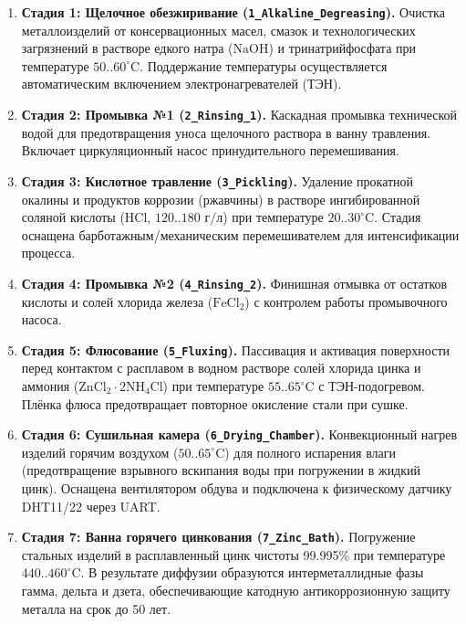 \documentclass[14pt, a4paper]{extarticle}
\begin{document}
\begin{enumerate}
    \item \textbf{Стадия 1: Щелочное обезжиривание (\texttt{1\_Alkaline\_Degreasing}).} Очистка металлоизделий от консервационных масел, смазок и технологических загрязнений в растворе едкого натра ($\mathrm{NaOH}$) и тринатрийфосфата при температуре $50..60^\circ\text{C}$. Поддержание температуры осуществляется автоматическим включением электронагревателей (ТЭН).
    \item \textbf{Стадия 2: Промывка №1 (\texttt{2\_Rinsing\_1}).} Каскадная промывка технической водой для предотвращения уноса щелочного раствора в ванну травления. Включает циркуляционный насос принудительного перемешивания.
    \item \textbf{Стадия 3: Кислотное травление (\texttt{3\_Pickling}).} Удаление прокатной окалины и продуктов коррозии (ржавчины) в растворе ингибированной соляной кислоты ($\mathrm{HCl}$, $120..180\text{ г/л}$) при температуре $20..30^\circ\text{C}$. Стадия оснащена барботажным/механическим перемешивателем для интенсификации процесса.
    \item \textbf{Стадия 4: Промывка №2 (\texttt{4\_Rinsing\_2}).} Финишная отмывка от остатков кислоты и солей хлорида железа ($\mathrm{FeCl}_2$) с контролем работы промывочного насоса.
    \item \textbf{Стадия 5: Флюсование (\texttt{5\_Fluxing}).} Пассивация и активация поверхности перед контактом с расплавом в водном растворе солей хлорида цинка и аммония ($\mathrm{ZnCl}_2 \cdot 2\mathrm{NH}_4\mathrm{Cl}$) при температуре $55..65^\circ\text{C}$ с ТЭН-подогревом. Плёнка флюса предотвращает повторное окисление стали при сушке.
    \item \textbf{Стадия 6: Сушильная камера (\texttt{6\_Drying\_Chamber}).} Конвекционный нагрев изделий горячим воздухом ($50..65^\circ\text{C}$) для полного испарения влаги (предотвращение взрывного вскипания воды при погружении в жидкий цинк). Оснащена вентилятором обдува и подключена к физическому датчику DHT11/22 через UART.
    \item \textbf{Стадия 7: Ванна горячего цинкования (\texttt{7\_Zinc\_Bath}).} Погружение стальных изделий в расплавленный цинк чистоты 99.995\% при температуре $440..460^\circ\text{C}$. В результате диффузии образуются интерметаллидные фазы гамма, дельта и дзета, обеспечивающие катодную антикоррозионную защиту металла на срок до 50 лет.
\end{enumerate}
\end{document}
